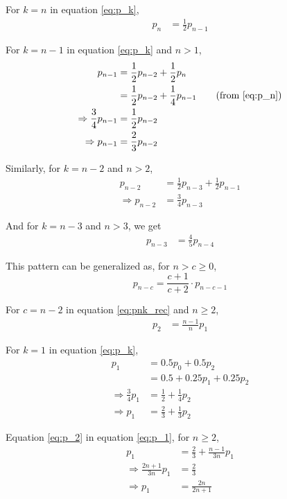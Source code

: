 \documentclass[11pt,a4paper,titlepage]{article}
\begin{document}
For $k = n$ in equation \ref{eq:p_k},
\begin{align}
    p_n &= \frac{1}{2} p_{n-1} \label{eq:p_n}
\end{align}

For $k = n - 1$ in equation \ref{eq:p_k} and $n > 1$,
\begin{align*}
    p_{n-1} &= \frac{1}{2} p_{n-2} + \frac{1}{2} p_n \\
            &= \frac{1}{2} p_{n-2} + \frac{1}{4} p_{n-1} \tag{from \ref{eq:p_n}} \\
    \Rightarrow \frac{3}{4} p_{n-1} &= \frac{1}{2} p_{n-2} \\
    \Rightarrow p_{n-1} &= \frac{2}{3} p_{n-2}
\end{align*}

Similarly, for $k = n - 2$ and $n > 2$,
\begin{align*}
    p_{n-2} &= \frac{1}{2} p_{n-3} + \frac{1}{2} p_{n-1} \\
    \Rightarrow p_{n-2} &= \frac{3}{4} p_{n-3}
\end{align*}

And for $k = n - 3$ and $n > 3$, we get
\begin{align*}
    p_{n-3} &= \frac{4}{5} p_{n-4}
\end{align*}

This pattern can be generalized as, for $n > c \ge 0$,
\begin{equation}\label{eq:pnk_rec}
    p_{n-c} = \frac{c + 1}{c + 2} \cdot p_{n-c-1}
\end{equation}

For $c = n - 2$ in equation \ref{eq:pnk_rec} and $n \ge 2$,
\begin{align}
    p_2 &= \frac{n - 1}{n} p_1 \label{eq:p_2}
\end{align}

For $k = 1$ in equation \ref{eq:p_k},
\begin{align}
    p_1 &= 0.5 p_0 + 0.5 p_2 \nonumber \\
        &= 0.5 + 0.25 p_1 + 0.25 p_2 \nonumber \\
    \Rightarrow \frac{3}{4} p_1 &= \frac{1}{2} + \frac{1}{4} p_2 \nonumber \\
    \Rightarrow p_1 &= \frac{2}{3} + \frac{1}{3} p_2 \label{eq:p_1}
\end{align}

Equation \ref{eq:p_2} in equation \ref{eq:p_1}, for $n \ge 2$,
\begin{align*}
    p_1 &= \frac{2}{3} + \frac{n - 1}{3n} p_1 \\
    \Rightarrow \frac{2n + 1}{3n} p_1 &= \frac{2}{3} \\
    \Rightarrow p_1 &= \frac{2n}{2n + 1}
\end{align*}
\end{document}
